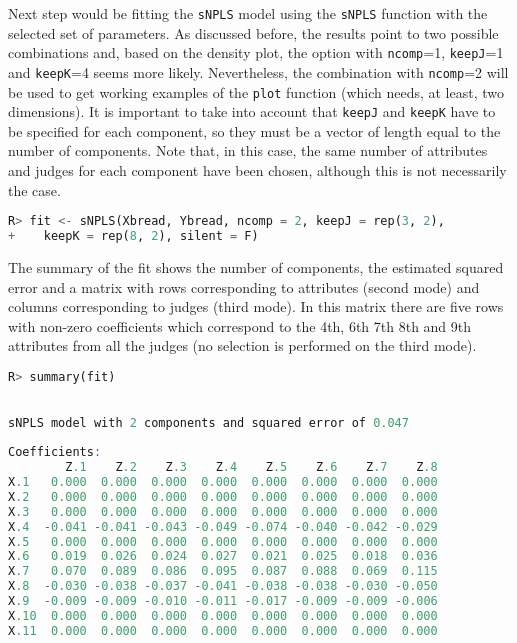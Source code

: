 Next step would be fitting the \texttt{sNPLS} model using the \texttt{sNPLS} function with the selected set of parameters. As discussed before, the results point to two possible combinations and, based on the density plot, the option with \texttt{ncomp}=1, \texttt{keepJ}=1 and \texttt{keepK}=4 seems more likely. Nevertheless, the combination with \texttt{ncomp}=2 will be used to get working examples of the \texttt{plot} function (which needs, at least, two dimensions). It is important to take into account that \texttt{keepJ} and \texttt{keepK} have to be specified for each component, so they must be a vector of length equal to the number of components. Note that, in this case, the same number of attributes and judges for each component have been chosen, although this is not necessarily the case.

\vspace{15pt}
\begin{lstlisting}[basicstyle=\small, language=Python, morekeywords={sNPLS, rep}]
R> fit <- sNPLS(Xbread, Ybread, ncomp = 2, keepJ = rep(3, 2), 
+    keepK = rep(8, 2), silent = F)
\end{lstlisting}   

The summary of the fit shows the number of components, the estimated squared error and a matrix with rows corresponding to attributes (second mode) and columns corresponding to judges (third mode). In this matrix there are five rows with non-zero coefficients which correspond to the 4th, 6th 7th 8th and 9th attributes from all the judges (no selection is performed on the third mode).

\vspace{15pt}
\begin{lstlisting}[basicstyle=\small, language=Python, morekeywords={summary}]
R> summary(fit)
\end{lstlisting}   

\begin{lstlisting}[basicstyle=\small, backgroundcolor=\color{output}, numbers=none, label={output4}, language=R, deletekeywords={model}, caption=Summary with the coefficients of the fitted model.]

sNPLS model with 2 components and squared error of 0.047 
 
Coefficients: 
        Z.1    Z.2    Z.3    Z.4    Z.5    Z.6    Z.7    Z.8
X.1   0.000  0.000  0.000  0.000  0.000  0.000  0.000  0.000
X.2   0.000  0.000  0.000  0.000  0.000  0.000  0.000  0.000
X.3   0.000  0.000  0.000  0.000  0.000  0.000  0.000  0.000
X.4  -0.041 -0.041 -0.043 -0.049 -0.074 -0.040 -0.042 -0.029
X.5   0.000  0.000  0.000  0.000  0.000  0.000  0.000  0.000
X.6   0.019  0.026  0.024  0.027  0.021  0.025  0.018  0.036
X.7   0.070  0.089  0.086  0.095  0.087  0.088  0.069  0.115
X.8  -0.030 -0.038 -0.037 -0.041 -0.038 -0.038 -0.030 -0.050
X.9  -0.009 -0.009 -0.010 -0.011 -0.017 -0.009 -0.009 -0.006
X.10  0.000  0.000  0.000  0.000  0.000  0.000  0.000  0.000
X.11  0.000  0.000  0.000  0.000  0.000  0.000  0.000  0.000
\end{lstlisting}  

